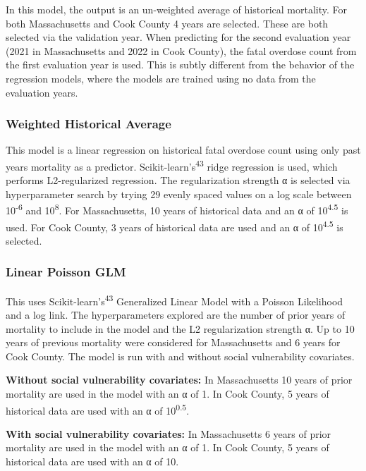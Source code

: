 In this model, the output is an un-weighted average of historical mortality. For both Massachusetts and Cook County 4 years are selected. These are both selected via the validation year. When predicting for the second evaluation year (2021 in Massachusetts and 2022 in Cook County), the fatal overdose count from the first evaluation year is used. This is subtly different from the behavior of the regression models, where the models are trained using no data from the evaluation years.

\subsubsection{Weighted Historical Average}\label{weighted-historical-average}

This model is a linear regression on historical fatal overdose count using only past years mortality as a predictor. Scikit-learn's\textsuperscript{43} ridge regression is used, which performs L2-regularized regression. The regularization strength α is selected via hyperparameter search by trying 29 evenly spaced values on a log scale between 10\textsuperscript{-6} and 10\textsuperscript{8}. For Massachusetts, 10 years of historical data and an α of 10\textsuperscript{4.5} is used. For Cook County, 3 years of historical data are used and an α of 10\textsuperscript{4.5} is selected.

\subsubsection{Linear Poisson GLM}\label{linear-poisson-glm}

This uses Scikit-learn's\textsuperscript{43} Generalized Linear Model with a Poisson Likelihood and a log link. The hyperparameters explored are the number of prior years of mortality to include in the model and the L2 regularization strength α. Up to 10 years of previous mortality were considered for Massachusetts and 6 years for Cook County. The model is run with and without social vulnerability covariates.

\textbf{Without social vulnerability covariates:} In Massachusetts 10 years of prior mortality are used in the model with an α of 1. In Cook County, 5 years of historical data are used with an α of 10\textsuperscript{0.5}.

\textbf{With social vulnerability covariates:} In Massachusetts 6 years of prior mortality are used in the model with an α of 1. In Cook County, 5 years of historical data are used with an α of 10.

